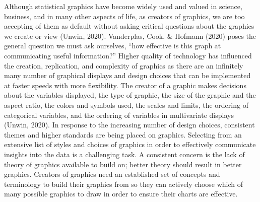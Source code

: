 \documentclass[print]{nuthesis}
\begin{document}
Although statistical graphics have become widely used and valued in science, business, and in many other aspects of life, as creators of graphics, we are too accepting of them as default without asking critical questions about the graphics we create or view (Unwin, 2020).
Vanderplas, Cook, \& Hofmann (2020) poses the general question we must ask ourselves, ``how effective is this graph at communicating useful information?''
Higher quality of technology has influenced the creation, replication, and complexity of graphics as there are an infinitely many number of graphical displays and design choices that can be implemented at faster speeds with more flexibility.
The creator of a graphic makes decisions about the variables displayed, the type of graphic, the size of the graphic and the aspect ratio, the colors and symbols used, the scales and limits, the ordering of categorical variables, and the ordering of variables in multivariate displays (Unwin, 2020).
In response to the increasing number of design choices, consistent themes and higher standards are being placed on graphics.
Selecting from an extensive list of styles and choices of graphics in order to effectively communicate insights into the data is a challenging task.
A consistent concern is the lack of theory of graphics available to build on; better theory should result in better graphics.
Creators of graphics need an established set of concepts and terminology to build their graphics from so they can actively choose which of many possible graphics to draw in order to ensure their charts are effective.
\end{document}
